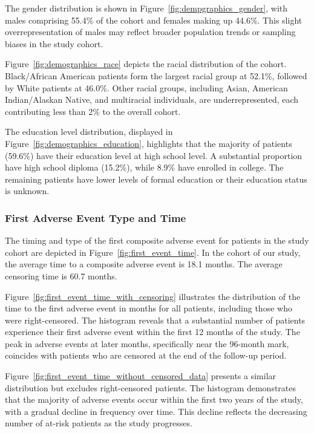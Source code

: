 The gender distribution is shown in Figure~\ref{fig:dempgraphics_gender}, with males comprising 55.4\% of the cohort and females making up 44.6\%.
This slight overrepresentation of males may reflect broader population trends or sampling biases in the study cohort.
 
Figure~\ref{fig:demographics_race} depicts the racial distribution of the cohort.
Black/African American patients form the largest racial group at 52.1\%, followed by White patients at 46.0\%.
Other racial groups, including Asian, American Indian/Alaskan Native, and multiracial individuals, are underrepresented, each contributing less than 2\% to the overall cohort.
 
The education level distribution, displayed in Figure~\ref{fig:demographics_education}, highlights that the majority of patients (59.6\%) have their education level at high school level.
A substantial proportion have high school diploma (15.2\%), while 8.9\% have enrolled in college.
The remaining patients have lower levels of formal education or their education status is unknown.

\subsubsection{First Adverse Event Type and Time}
\label{apd:cohort_first_event}

The timing and type of the first composite adverse event for patients in the study cohort are depicted in Figure~\ref{fig:first_event_time}. 
In the cohort of our study, the average time to a composite adverse event is 18.1 months. 
The average censoring time is 60.7 months.

Figure~\ref{fig:first_event_time_with_censoring} illustrates the distribution of the time to the first adverse event in months for all patients, including those who were right-censored. 
The histogram reveals that a substantial number of patients experience their first adverse event within the first 12 months of the study. 
The peak in adverse events at later months, specifically near the 96-month mark, coincides with patients who are censored at the end of the follow-up period. 

Figure~\ref{fig:first_event_time_without_censored_data} presents a similar distribution but excludes right-censored patients. 
The histogram demonstrates that the majority of adverse events occur within the first two years of the study, with a gradual decline in frequency over time. 
This decline reflects the decreasing number of at-risk patients as the study progresses. 

